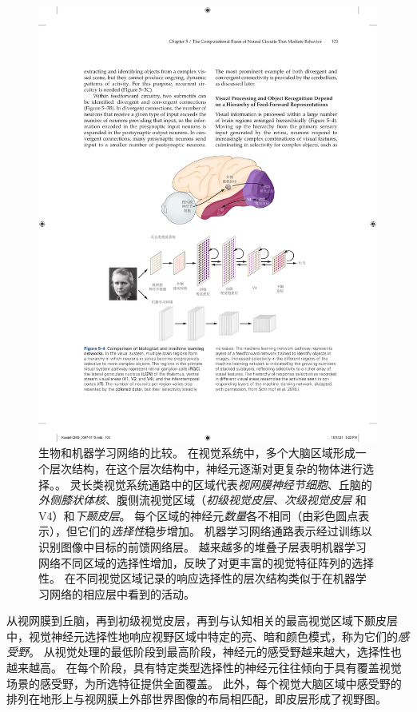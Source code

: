 \begin{figure}[htbp]
	\centering
	\includegraphics[width=1.0\linewidth]{chap05/fig_5_4}
	\caption{生物和机器学习网络的比较。
		在视觉系统中，多个大脑区域形成一个层次结构，在这个层次结构中，神经元逐渐对更复杂的物体进行选择。。
		灵长类视觉系统通路中的区域代表\textit{视网膜神经节细胞}、丘脑的\textit{外侧膝状体核}、腹侧流视觉区域（\textit{初级视觉皮层}、\textit{次级视觉皮层} 和 V4）和\textit{下颞皮层}。
		每个区域的神经元\textit{数量}各不相同（由彩色圆点表示），但它们的\textit{选择性}稳步增加。
		机器学习网络通路表示经过训练以识别图像中目标的前馈网络层。
		越来越多的堆叠子层表明机器学习网络不同区域的选择性增加，反映了对更丰富的视觉特征阵列的选择性。
		在不同视觉区域记录的响应选择性的层次结构类似于在机器学习网络的相应层中看到的活动\cite{schrimpf2018brain}。}
	\label{fig:5_4}
\end{figure}



从视网膜到丘脑，再到初级视觉皮层，再到与认知相关的最高视觉区域下颞皮层中，视觉神经元选择性地响应视野区域中特定的亮、暗和颜色模式，称为它们的\textit{感受野}。
从视觉处理的最低阶段到最高阶段，神经元的感受野越来越大，选择性也越来越高。
在每个阶段，具有特定类型选择性的神经元往往倾向于具有覆盖视觉场景的感受野，为所选特征提供全面覆盖。
此外，每个视觉大脑区域中感受野的排列在地形上与视网膜上外部世界图像的布局相匹配，即皮层形成了视野图。



